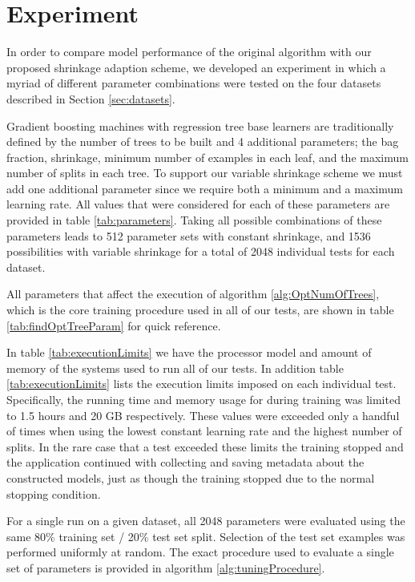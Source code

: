 \documentclass[9pt, conference]{IEEEtran}
\begin{document}
\section {Experiment}
In order to compare model performance of the original algorithm with our proposed shrinkage adaption scheme, we developed an experiment in which a myriad of different parameter combinations were tested on the four datasets described in Section \ref{sec:datasets}. 

Gradient boosting machines with regression tree base learners are traditionally defined by the number of trees to be built and 4 additional parameters; the bag fraction, shrinkage, minimum number of examples in each leaf, and the maximum number of splits in each tree. To support our variable shrinkage scheme we must add one additional parameter since we require both a minimum and a maximum learning rate. All values that were considered for each of these parameters are provided in table \ref{tab:parameters}. Taking all possible combinations of these parameters leads to 512 parameter sets with constant shrinkage, and 1536 possibilities with variable shrinkage for a total of 2048 individual tests for each dataset. 

All parameters that affect the execution of algorithm \ref{alg:OptNumOfTrees}, which is the core training procedure used in all of our tests, are shown in table \ref{tab:findOptTreeParam} for quick reference. 

In table \ref{tab:executionLimits} we have the processor model and amount of memory of the systems used to run all of our tests. In addition table  \ref{tab:executionLimits} lists the execution limits imposed on each individual test. Specifically, the running time and memory usage for during training was limited to 1.5 hours and 20 GB respectively. These values were exceeded only a handful of times when using the lowest constant learning rate and the highest number of splits. In the rare case that a test exceeded these limits the training stopped and the application continued with collecting and saving metadata about the constructed models, just as though the training stopped due to the normal stopping condition.

For a single run on a given dataset, all 2048 parameters were evaluated using the same 80\% training set / 20\% test set split. Selection of the test set examples was performed uniformly at random. The exact procedure used to evaluate a single set of parameters is provided in algorithm \ref{alg:tuningProcedure}.
\end{document}
